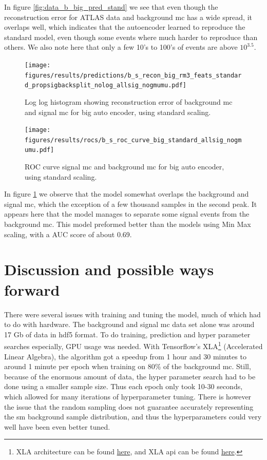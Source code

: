 \documentclass[ reprint, amsmath,amssymb, aps, nofootinbib]{revtex4-2}
\begin{document}
In figure \ref{fig:data_b_big_pred_stand} we see that even though the reconstruction error for ATLAS data and background mc has a wide spread, it overlaps well, which indicates that the autoencoder learned to reproduce the standard model, even though some events where much harder to reproduce than others. We also note here that only a few 10's to 100's of events are above $10^{3.5}$. 

\begin{figure}[H]
    \centering
    \texttt{[image: figures/results/predictions/b\_s\_recon\_big\_rm3\_feats\_standard\_propsigbacksplit\_nolog\_allsig\_nogmumu.pdf]}
    \caption{Log log histogram showing reconstruction error of background mc and signal mc for big auto encoder, using standard scaling. }
    \label{fig:s_b_big_pred_stand}
\end{figure}

\begin{figure}[H]
    \centering
         \texttt{[image: figures/results/rocs/b\_s\_roc\_curve\_big\_standard\_allsig\_nogmumu.pdf]}
         \caption{ROC curve signal mc and background mc for big auto encoder, using standard scaling.}
         \label{fig:s_b_big_roc_stand}
\end{figure}



In figure \ref{fig:s_b_big_pred_stand} we observe that the model somewhat overlaps the background and signal mc, which the exception of a few thousand samples in the second peak. It appears here that the model manages to separate some signal events from the background mc. This model preformed better than the models using Min Max scaling, with a AUC score of about 0.69. \par 

\section{Discussion and possible ways forward}
There were several issues with training and tuning the model, much of which had to do with hardware. The background and signal mc data set alone was around 17 Gb of data in hdf5 format. To do training, prediction and hyper parameter searches especially, GPU usage was needed. With Tensorflow's XLA\footnote{XLA architecture can be found \href{https://www.tensorflow.org/xla/architecture}{here}, and XLA api can be found \href{https://www.tensorflow.org/xla}{here}.} (Accelerated Linear Algebra), the algorithm got a speedup from 1 hour and 30 minutes to around 1 minute per epoch when training on 80\% of the background mc. Still, because of the enormous amount of data, the hyper parameter search had to be done using a smaller sample size. Thus each epoch only took 10-30 seconds, which allowed for many iterations of hyperparameter tuning. There is however the issue that the random sampling does not guarantee accurately representing the sm background sample distribution, and thus the hyperparameters could very well have been even better tuned.  \par \par
\end{document}
